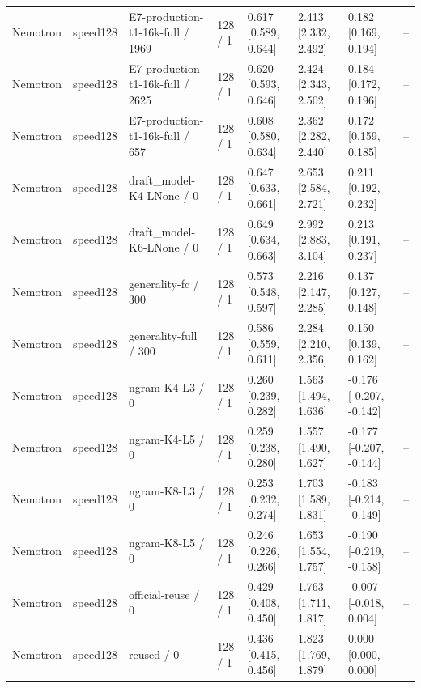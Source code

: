 \begin{tabular}{llllllll}
Nemotron & speed128 & E7-production-t1-16k-full / 1969 & 128 / 1 & 0.617 [0.589, 0.644] & 2.413 [2.332, 2.492] & 0.182 [0.169, 0.194] & -- \\
Nemotron & speed128 & E7-production-t1-16k-full / 2625 & 128 / 1 & 0.620 [0.593, 0.646] & 2.424 [2.343, 2.502] & 0.184 [0.172, 0.196] & -- \\
Nemotron & speed128 & E7-production-t1-16k-full / 657 & 128 / 1 & 0.608 [0.580, 0.634] & 2.362 [2.282, 2.440] & 0.172 [0.159, 0.185] & -- \\
Nemotron & speed128 & draft\_model-K4-LNone / 0 & 128 / 1 & 0.647 [0.633, 0.661] & 2.653 [2.584, 2.721] & 0.211 [0.192, 0.232] & -- \\
Nemotron & speed128 & draft\_model-K6-LNone / 0 & 128 / 1 & 0.649 [0.634, 0.663] & 2.992 [2.883, 3.104] & 0.213 [0.191, 0.237] & -- \\
Nemotron & speed128 & generality-fc / 300 & 128 / 1 & 0.573 [0.548, 0.597] & 2.216 [2.147, 2.285] & 0.137 [0.127, 0.148] & -- \\
Nemotron & speed128 & generality-full / 300 & 128 / 1 & 0.586 [0.559, 0.611] & 2.284 [2.210, 2.356] & 0.150 [0.139, 0.162] & -- \\
Nemotron & speed128 & ngram-K4-L3 / 0 & 128 / 1 & 0.260 [0.239, 0.282] & 1.563 [1.494, 1.636] & -0.176 [-0.207, -0.142] & -- \\
Nemotron & speed128 & ngram-K4-L5 / 0 & 128 / 1 & 0.259 [0.238, 0.280] & 1.557 [1.490, 1.627] & -0.177 [-0.207, -0.144] & -- \\
Nemotron & speed128 & ngram-K8-L3 / 0 & 128 / 1 & 0.253 [0.232, 0.274] & 1.703 [1.589, 1.831] & -0.183 [-0.214, -0.149] & -- \\
Nemotron & speed128 & ngram-K8-L5 / 0 & 128 / 1 & 0.246 [0.226, 0.266] & 1.653 [1.554, 1.757] & -0.190 [-0.219, -0.158] & -- \\
Nemotron & speed128 & official-reuse / 0 & 128 / 1 & 0.429 [0.408, 0.450] & 1.763 [1.711, 1.817] & -0.007 [-0.018, 0.004] & -- \\
Nemotron & speed128 & reused / 0 & 128 / 1 & 0.436 [0.415, 0.456] & 1.823 [1.769, 1.879] & 0.000 [0.000, 0.000] & -- \\
\hline
\end{tabular}
